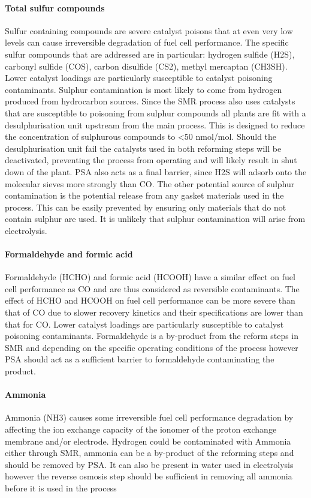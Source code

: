 \paragraph{Total sulfur compounds}
Sulfur containing compounds are severe catalyst poisons that at even very low levels can cause irreversible 
degradation of fuel cell performance. The specific sulfur compounds that are addressed are in particular: 
hydrogen sulfide (H2S), carbonyl sulfide (COS), carbon disulfide (CS2), methyl mercaptan (CH3SH). 
Lower catalyst loadings are particularly susceptible to catalyst poisoning contaminants.
Sulphur contamination is most likely to come from hydrogen produced from hydrocarbon sources. 
Since the SMR process also uses catalysts that are susceptible to poisoning from sulphur compounds all 
plants are fit with a desulphurisation unit upstream from the main process. 
This is designed to reduce the concentration of sulphurous compounds to <50 nmol/mol. 
Should the desulphurisation unit fail the catalysts used in both reforming steps will be deactivated, 
preventing the process from operating and will likely result in shut down of the plant. 
PSA also acts as a final barrier, since H2S will adsorb onto the molecular sieves more strongly than CO.
The other potential source of sulphur contamination is the potential release from any gasket materials 
used in the process. This can be easily prevented by ensuring only materials that do not contain sulphur are 
used. 
It is unlikely that sulphur contamination will arise from electrolysis. 

\paragraph{Formaldehyde and formic acid}
Formaldehyde (HCHO) and formic acid (HCOOH) have a similar effect on fuel cell performance as CO and are 
thus considered as reversible contaminants. The effect of HCHO and HCOOH on fuel cell performance can be 
more severe than that of CO due to slower recovery kinetics and their specifications are lower than that for CO. 
Lower catalyst loadings are particularly susceptible to catalyst poisoning contaminants.
Formaldehyde is a by-product from the reform steps in SMR and depending on the specific operating conditions 
of the process however PSA should act as a sufficient barrier to formaldehyde contaminating the product.
\paragraph{Ammonia}
Ammonia (NH3) causes some irreversible fuel cell performance degradation by affecting the ion exchange 
capacity of the ionomer of the proton exchange membrane and/or electrode.
Hydrogen could be contaminated with Ammonia either through SMR, ammonia can be a by-product of the reforming 
steps and should be removed by PSA. It can also be present in water used in electrolysis however the reverse 
osmosis step should be sufficient in removing all ammonia before it is used in the process 

